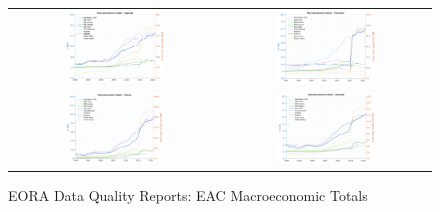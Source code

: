 \documentclass[a4paper]{article}
\begin{document}
\begin{figure} \centering
\caption{EORA Data Quality Reports: EAC Macroeconomic Totals}
\label{fig:EORADQMT}
\vspace{2mm}
\begin{tabular}{cc}
\includegraphics[width=0.5\textwidth, trim= {0 0 0 0}, clip]{"Figures/DataQuality_UGA.png"} & \includegraphics[width=0.52\textwidth, trim= {0 0 0 0}, clip]{"Figures/DataQuality_TZA.png"} \\
\includegraphics[width=0.5\textwidth, trim= {0 0 0 0}, clip]{"Figures/DataQuality_KEN.png"} & \includegraphics[width=0.5\textwidth, trim= {0 0 0 0}, clip]{"Figures/DataQuality_RWA.png"} \\

\end{tabular}
\end{figure}
\end{document}
